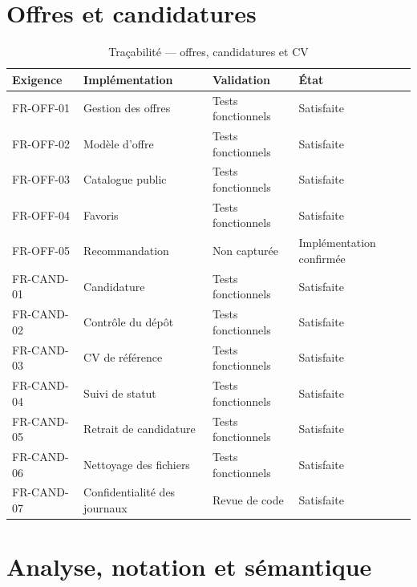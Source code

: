\section{Offres et candidatures}

\begin{table}[htbp]
  \centering
  \caption{Traçabilité — offres, candidatures et CV}
  \begin{tabularx}{\textwidth}{L{2.3cm} L{3.4cm} L{3.0cm} X}
    \toprule
    \textbf{Exigence} & \textbf{Implémentation} & \textbf{Validation} & \textbf{État} \\
    \midrule
    FR-OFF-01  & Gestion des offres & Tests fonctionnels & Satisfaite \\
    FR-OFF-02  & Modèle d'offre & Tests fonctionnels & Satisfaite \\
    FR-OFF-03  & Catalogue public & Tests fonctionnels & Satisfaite \\
    FR-OFF-04  & Favoris & Tests fonctionnels & Satisfaite \\
    FR-OFF-05  & Recommandation & Non capturée & Implémentation confirmée \\
    FR-CAND-01 & Candidature & Tests fonctionnels & Satisfaite \\
    FR-CAND-02 & Contrôle du dépôt & Tests fonctionnels & Satisfaite \\
    FR-CAND-03 & CV de référence & Tests fonctionnels & Satisfaite \\
    FR-CAND-04 & Suivi de statut & Tests fonctionnels & Satisfaite \\
    FR-CAND-05 & Retrait de candidature & Tests fonctionnels & Satisfaite \\
    FR-CAND-06 & Nettoyage des fichiers & Tests fonctionnels & Satisfaite \\
    FR-CAND-07 & Confidentialité des journaux & Revue de code & Satisfaite \\
    \bottomrule
  \end{tabularx}
\end{table}

\section{Analyse, notation et sémantique}

